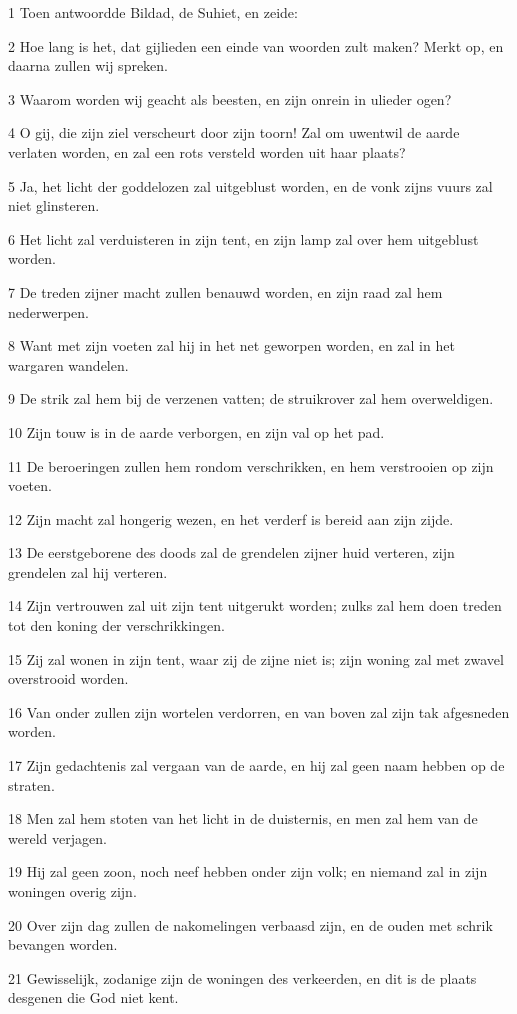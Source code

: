 \par 1 Toen antwoordde Bildad, de Suhiet, en zeide:
\par 2 Hoe lang is het, dat gijlieden een einde van woorden zult maken? Merkt op, en daarna zullen wij spreken.
\par 3 Waarom worden wij geacht als beesten, en zijn onrein in ulieder ogen?
\par 4 O gij, die zijn ziel verscheurt door zijn toorn! Zal om uwentwil de aarde verlaten worden, en zal een rots versteld worden uit haar plaats?
\par 5 Ja, het licht der goddelozen zal uitgeblust worden, en de vonk zijns vuurs zal niet glinsteren.
\par 6 Het licht zal verduisteren in zijn tent, en zijn lamp zal over hem uitgeblust worden.
\par 7 De treden zijner macht zullen benauwd worden, en zijn raad zal hem nederwerpen.
\par 8 Want met zijn voeten zal hij in het net geworpen worden, en zal in het wargaren wandelen.
\par 9 De strik zal hem bij de verzenen vatten; de struikrover zal hem overweldigen.
\par 10 Zijn touw is in de aarde verborgen, en zijn val op het pad.
\par 11 De beroeringen zullen hem rondom verschrikken, en hem verstrooien op zijn voeten.
\par 12 Zijn macht zal hongerig wezen, en het verderf is bereid aan zijn zijde.
\par 13 De eerstgeborene des doods zal de grendelen zijner huid verteren, zijn grendelen zal hij verteren.
\par 14 Zijn vertrouwen zal uit zijn tent uitgerukt worden; zulks zal hem doen treden tot den koning der verschrikkingen.
\par 15 Zij zal wonen in zijn tent, waar zij de zijne niet is; zijn woning zal met zwavel overstrooid worden.
\par 16 Van onder zullen zijn wortelen verdorren, en van boven zal zijn tak afgesneden worden.
\par 17 Zijn gedachtenis zal vergaan van de aarde, en hij zal geen naam hebben op de straten.
\par 18 Men zal hem stoten van het licht in de duisternis, en men zal hem van de wereld verjagen.
\par 19 Hij zal geen zoon, noch neef hebben onder zijn volk; en niemand zal in zijn woningen overig zijn.
\par 20 Over zijn dag zullen de nakomelingen verbaasd zijn, en de ouden met schrik bevangen worden.
\par 21 Gewisselijk, zodanige zijn de woningen des verkeerden, en dit is de plaats desgenen die God niet kent.

